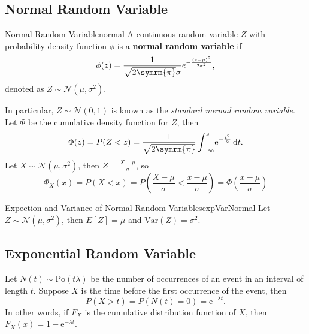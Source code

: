\documentclass[math]{amznotes}
\theoremstyle{remark}
\begin{document}
\subsection{Normal Random Variable}
\begin{dfnbox}{Normal Random Variable}{normal}
    A continuous random variable $Z$ with probability density function $\phi$ is a {\color{red} \textbf{normal random variable}} if 
    \begin{equation*}
        \phi(z) = \frac{1}{\sqrt{2\symrm{\pi}}\sigma}e^{-\frac{(z - \mu)^2}{2\sigma^2}},
    \end{equation*}
    denoted as $Z \sim \mathcal{N}\left(\mu, \sigma^2\right)$.
\end{dfnbox}
In particular, $Z \sim \mathcal{N}(0, 1)$ is known as the \textit{standard normal random variable}. Let $\Phi$ be the cumulative density function for $Z$, then 
\begin{equation*}
    \Phi(z) = P(Z < z) = \frac{1}{\sqrt{2\symrm{\pi}}}\int_{-\infty}^{z}\!\mathrm{e}^{-\frac{t^2}{2}} \,\mathrm{d}t.
\end{equation*}
Let $X \sim \mathcal{N}(\mu, \sigma^2)$, then $Z = \frac{X - \mu}{\sigma}$, so
\begin{equation*}
    \Phi_X(x) = P\left(X < x\right) = P\left(\frac{X - \mu}{\sigma} < \frac{x - \mu}{\sigma}\right) = \Phi\left(\frac{x - \mu}{\sigma}\right)
\end{equation*}
\begin{thmbox}{Expection and Variance of Normal Random Variables}{expVarNormal}
    Let $Z \sim \mathcal{N}(\mu, \sigma^2)$, then $E[Z] = \mu$ and $\mathrm{Var}(Z) = \sigma^2$.
\end{thmbox}

\subsection{Exponential Random Variable}
Let $N(t) \sim \mathrm{Po}(t\lambda)$ be the number of occurrences of an event in an interval of length $t$. Suppose $X$ is the time before the first occurrence of the event, then
\begin{equation*}
    P(X > t) = P(N(t) = 0) = \mathrm{e}^{-\lambda t}.
\end{equation*}
In other words, if $F_X$ is the cumulative distribution function of $X$, then $F_X(x) = 1 - \mathrm{e}^{-\lambda t}$.
\end{document}
